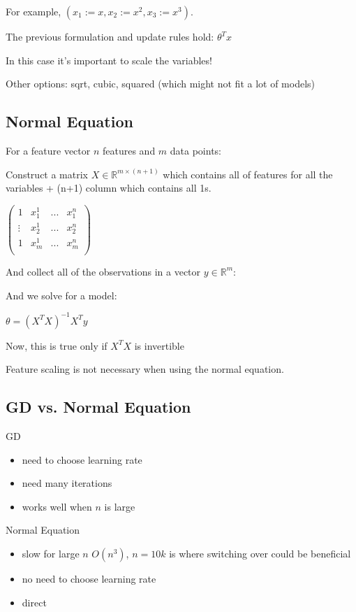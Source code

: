 For example, $(x_1 := x, x_2 := x^2, x_3 := x^3)$. 

The previous formulation and update rules hold: $\theta^Tx$

In this case it's important to scale the variables!

Other options: sqrt, cubic, squared (which might not fit a lot of models)

\subsection{Normal Equation}

For a feature vector $n$ features and $m$ data points: 

Construct a matrix $X  \in \mathbb{R}^{m\times (n+1)}$ which contains all of features for all the variables + (n+1) column which contains all 1s.

$\left( \begin{matrix} 1 & x_1^1 & ... & x_1^n \\ \vdots & x_2^1 & ... & x_2^n \\   1 & x_m^1 & ... & x_m^n \\ \end{matrix} \right)$

And collect all of the observations in a vector $y \in \mathbb{R}^m $:

And we solve for a model:

$\theta = (X^T X)^{-1} X^T y$

Now, this is true only if $X^T X$ is invertible

Feature scaling is not necessary when using the normal equation.

\subsection{GD vs. Normal Equation}

GD
\begin{itemize}
\item need to choose learning rate
\item need many iterations
\item works well when $n$ is large
\end{itemize}

Normal Equation 
\begin{itemize}
\item slow for large $n$  $O(n^3)$, $n=10k$ is where switching over could be beneficial
\item no need to choose learning rate
\item direct
\end{itemize}


